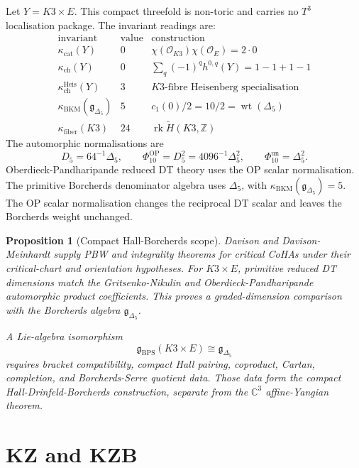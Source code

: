 \documentclass[11pt]{article}
\newtheorem{proposition}[theorem]{Proposition}
\begin{document}
Let $Y=K3\times E$. This compact threefold is non-toric and carries no
$T^3$ localisation package. The invariant readings are:
\[
\begin{array}{c|c|l}
\text{invariant} & \text{value} & \text{construction}\\\hline
\kappa_{\mathrm{cat}}(Y) & 0 &
\chi(\mathcal{O}_{K3})\chi(\mathcal{O}_{E})=2\cdot 0\\
\kappa_{\mathrm{ch}}(Y) & 0 &
\sum_q(-1)^qh^{0,q}(Y)=1-1+1-1\\
\kappa_{\mathrm{ch}}^{\mathrm{Heis}}(Y) & 3 &
K3\text{-fibre Heisenberg specialisation}\\
\kappa_{\mathrm{BKM}}(\mathfrak{g}_{\Delta_5}) & 5 &
c_1(0)/2=10/2=\operatorname{wt}(\Delta_5)\\
\kappa_{\mathrm{fiber}}(K3) & 24 &
\operatorname{rk}\widetilde{H}(K3,\mathbb{Z})
\end{array}
\]
The automorphic normalisations are
\[
D_5=64^{-1}\Delta_5,\qquad
\Phi_{10}^{\mathrm{OP}}=D_5^2=4096^{-1}\Delta_5^2,\qquad
\Phi_{10}^{\mathrm{un}}=\Delta_5^2.
\]
Oberdieck-Pandharipande reduced DT theory uses the OP scalar
normalisation. The primitive Borcherds denominator algebra uses
$\Delta_5$, with
$\kappa_{\mathrm{BKM}}(\mathfrak{g}_{\Delta_5})=5$. The OP scalar
normalisation changes the reciprocal DT scalar and leaves the
Borcherds weight unchanged.

\begin{proposition}[Compact Hall-Borcherds scope]
\label{prop:k3e-scope}
Davison and Davison-Meinhardt supply PBW and integrality theorems for
critical CoHAs under their critical-chart and orientation hypotheses.
For $K3\times E$, primitive reduced DT dimensions match the
Gritsenko-Nikulin and Oberdieck-Pandharipande automorphic product
coefficients. This proves a graded-dimension comparison with the
Borcherds algebra $\mathfrak{g}_{\Delta_5}$.

A Lie-algebra isomorphism
\[
\mathfrak{g}_{\mathrm{BPS}}(K3\times E)
\cong
\mathfrak{g}_{\Delta_5}
\]
requires bracket compatibility, compact Hall pairing, coproduct,
Cartan, completion, and Borcherds-Serre quotient data. Those data form
the compact Hall-Drinfeld-Borcherds construction, separate from the
$\mathbb{C}^3$ affine-Yangian theorem.
\end{proposition}

\section{KZ and KZB}
\end{document}
